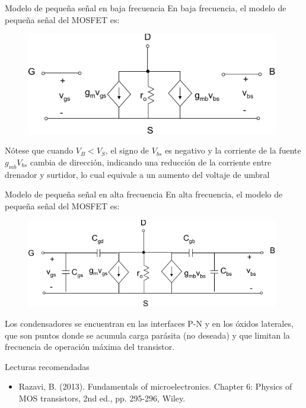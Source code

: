 \documentclass[t,aspectratio=169]{beamer}
\begin{document}
\begin{frame}{Modelo de pequeña señal en baja frecuencia}
En baja frecuencia, el modelo de pequeña señal del MOSFET es:

\begin{figure}
    \centering
    \includegraphics[width=11cm]{./figuras/peqsenal.pdf}
\end{figure}

Nótese que cuando $V_B < V_S$, el signo de $V_{bs}$ es negativo y la corriente de la fuente $g_{mb}V_{bs}$ cambia de dirección, indicando una reducción de la corriente entre drenador y surtidor, lo cual equivale a un aumento del voltaje de umbral
\end{frame}


\begin{frame}{Modelo de pequeña señal en alta frecuencia}
En alta frecuencia, el modelo de pequeña señal del MOSFET es:

\begin{figure}
    \centering
    \includegraphics[width=11cm]{./figuras/peqsenal2.pdf}
\end{figure}

Los condensadores se encuentran en las interfaces P-N y en los óxidos laterales, que son puntos donde se acumula carga parásita (no deseada) y que limitan la frecuencia de operación máxima del transistor.

\end{frame}


\begin{frame}{Lecturas recomendadas}

\begin{itemize}
    \item Razavi, B. (2013). Fundamentals of microelectronics. Chapter 6: Physics of MOS transistors, 2nd ed., pp. 295-296, Wiley.
\end{itemize}

\end{frame}
\end{document}
